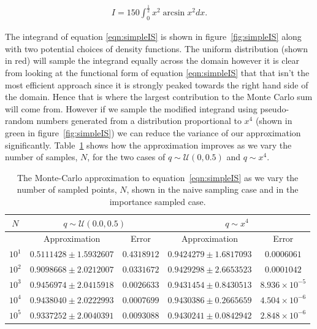 	\begin{align}
		I = 150\int_{0}^{\frac{1}{2}}x^2\arcsin x^2dx.
		\label{eqn:simpleIS}
	\end{align}

	The integrand of equation \ref{eqn:simpleIS} is shown in figure~\ref{fig:simpleIS} along with two potential choices of density functions.
	The uniform distribution (shown in red) will sample the integrand equally across the domain however it is clear from looking
	at the functional form of equation \ref{eqn:simpleIS} that that isn't the most efficient approach since it is strongly peaked towards the
	right hand side of the domain.  Hence that is where the largest contribution to the Monte Carlo sum will come from.  However if we sample
	the modified integrand using pseudo-random numbers generated from a distribution proportional to $x^4$ (shown in green in figure~\ref{fig:simpleIS})
	we can reduce the variance of our approximation significantly.  Table~\ref{tab:simpleIS} shows how the approximation improves as we vary
	the number of samples, $N$, for the two cases of $q\sim\mathcal{U}(0,0.5)$ and $q\sim x^4$.

	\begin{table}[htp]
		\begin{center}
		\begin{tabular}{c | c | c | c | c}
		$N$       & \multicolumn{2}{c|}{$q\sim\mathcal{U}(0.0,0.5)$} & \multicolumn{2}{c}{$q\sim x^4$} \\ \hline
		          & Approximation & Error       & Approximation & Error       \\ \hline
		$10^1$    & $0.5111428 \pm 1.5932607$ & $0.4318912$ & $0.9424279 \pm 1.6817093$ & $0.0006061$ \\
		$10^2$    & $0.9098668 \pm 2.0212007$ & $0.0331672$ & $0.9429298 \pm 2.6653523$ & $0.0001042$ \\
		$10^3$    & $0.9456974 \pm 2.0415918$ & $0.0026633$ & $0.9431454 \pm 0.8430513$ & $8.936\times10^{-5}$ \\
		$10^4$    & $0.9438040 \pm 2.0222993$ & $0.0007699$ & $0.9430386 \pm 0.2665659$ & $4.504\times10^{-6}$ \\
		$10^5$    & $0.9337252 \pm 2.0040391$ & $0.0093088$ & $0.9430241 \pm 0.0842942$ & $2.848\times10^{-6}$ \\
		\end{tabular}
		\caption{The Monte-Carlo approximation to equation~\ref{eqn:simpleIS} as we vary the number of sampled points, $N$, shown in
		the naive sampling case and in the importance sampled case.}
		\label{tab:simpleIS}
		\end{center}
	\end{table}

